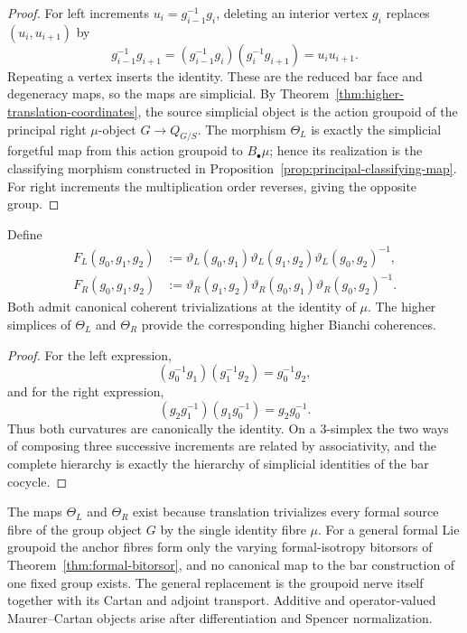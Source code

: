 \begin{proof}
For left increments $u_i=g_{i-1}^{-1}g_i$, deleting an interior vertex $g_i$
replaces $(u_i,u_{i+1})$ by
\[
    g_{i-1}^{-1}g_{i+1}
    =
    (g_{i-1}^{-1}g_i)(g_i^{-1}g_{i+1})
    =
    u_iu_{i+1}.
\]
Repeating a vertex inserts the identity.  These are the reduced bar face and
degeneracy maps, so the maps are simplicial.  By
Theorem~\ref{thm:higher-translation-coordinates}, the source simplicial object
is the action groupoid of the principal right $\mu$-object
$G\to Q_{G/S}$.  The morphism $\Theta_L$ is exactly the simplicial
forgetful map from this action groupoid to $B_\bullet\mu$; hence its
realization is the classifying morphism constructed in
Proposition~\ref{prop:principal-classifying-map}.  For right increments the
multiplication order reverses, giving the opposite group.
\end{proof}

\begin{proposition}
\label{prop:integrated-curvature}
Define
\[
\begin{aligned}
    F_L(g_0,g_1,g_2)
    &:=
    \vartheta_L(g_0,g_1)
    \vartheta_L(g_1,g_2)
    \vartheta_L(g_0,g_2)^{-1},\\
    F_R(g_0,g_1,g_2)
    &:=
    \vartheta_R(g_1,g_2)
    \vartheta_R(g_0,g_1)
    \vartheta_R(g_0,g_2)^{-1}.
\end{aligned}
\]
Both admit canonical coherent trivializations at the identity of $\mu$.  The
higher simplices of $\Theta_L$ and $\Theta_R$ provide the corresponding higher
Bianchi coherences.
\end{proposition}

\begin{proof}
For the left expression,
\[
    (g_0^{-1}g_1)(g_1^{-1}g_2)
    =
    g_0^{-1}g_2,
\]
and for the right expression,
\[
    (g_2g_1^{-1})(g_1g_0^{-1})
    =
    g_2g_0^{-1}.
\]
Thus both curvatures are canonically the identity.  On a $3$-simplex the two
ways of composing three successive increments are related by associativity,
and the complete hierarchy is exactly the hierarchy of simplicial identities
of the bar cocycle.
\end{proof}

\begin{remark}
\label{rem:no-general-fixed-group-mc}
The maps $\Theta_L$ and $\Theta_R$ exist because translation trivializes every
formal source fibre of the group object $G$ by the single identity fibre
$\mu$.  For a general formal Lie groupoid the anchor fibres form only the varying
formal-isotropy bitorsors of Theorem~\ref{thm:formal-bitorsor}, and no canonical map to the bar construction of one fixed group
exists.  The general replacement is the groupoid nerve itself together with
its Cartan and adjoint transport.  Additive and operator-valued
Maurer--Cartan objects arise after differentiation and Spencer normalization.
\end{remark}

